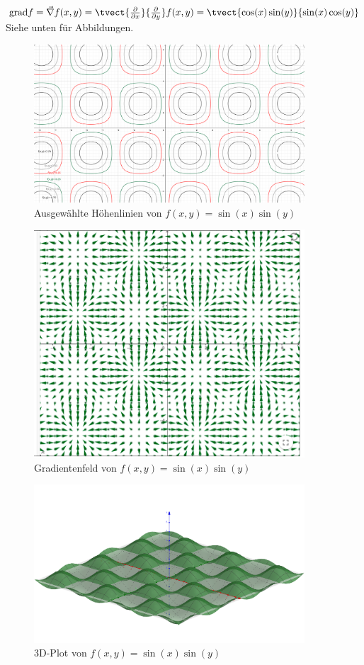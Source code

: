\item

$\text{grad} f = \vec \nabla f(x,y) = \tvect{\frac{\partial}{\partial x}}{\frac{\partial}{\partial y}} f(x,y) = \tvect{\cos(x)\sin(y)}{\sin(x)\cos(y)}$ Siehe unten für Abbildungen.

\begin{figure}[ht]
  \centering
  \includegraphics[width=0.9\textwidth]{../tex-snippets/ex-graph-contour-2-img-a.png}
  \caption{Ausgewählte Höhenlinien von $f(x,y)=\sin(x)\sin(y)$}
  \label{ex-graph-contour-2-img-a}
\end{figure}

\begin{figure}[ht]
  \centering
  \includegraphics[width=0.9\textwidth]{../tex-snippets/ex-graph-contour-2-img-b.png}
  \caption{Gradientenfeld von $f(x,y)=\sin(x)\sin(y)$}
  \label{ex-graph-contour-2-img-b}
\end{figure}

\begin{figure}[ht]
  \centering
  \includegraphics[width=0.9\textwidth]{../tex-snippets/ex-graph-contour-2-img-c.png}
  \caption{3D-Plot von $f(x,y)=\sin(x)\sin(y)$}
  \label{ex-graph-contour-2-img-c}
\end{figure}

